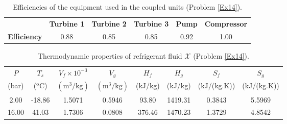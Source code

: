 \begin{enumerate}
\begin{table}[h]
\begin{center}
\begin{tabular}{||c | c c c c | c||}
\hline\hline
               &  {\bf Turbine 1} & {\bf Turbine 2}  & {\bf Turbine 3}  & {\bf Pump}  & {\bf Compressor}\\
{\bf Efficiency}&    0.88          &   0.85           &     0.85         &  0.92      &  1.00           \\
\hline\hline
\end{tabular}
\end{center}
\caption{Efficiencies of the equipment used in the coupled units (Problem \ref{Ex14}).}\label{Ex14:Tab2}
\end{table}


\begin{table}[h]
\begin{center}
\begin{tabular}{|c c| c c c c c c | }
\hline
$P$             & $T_{s}$   & $V_{f}\times 10^{-3}$  &  $V_{g}$   & $H_{f}$  & $H_{g}$   &  $S_{f}$   &  $S_{g}$    \\
(bar)   &  ($^{\text{o}}$C)  & $\left(\text{m}^{3}/\text{kg}\right)$ & $\left(\text{m}^{3}/\text{kg}\right)$ & (kJ/kg) & (kJ/kg) & (kJ/(kg.K)) &  (kJ/(kg.K))  \\
\hline
2.00    &  -18.86  & 1.5071  &  0.5946   &   93.80  & 1419.31  &  0.3843  & 5.5969   \\
16.00   &   41.03  & 1.7306  &  0.0808   &  376.46  &  1470.23 &  1.3729  & 4.8542   \\
\hline
\end{tabular}
\end{center}
\caption{Thermodynamic properties of refrigerant fluid $\mathcal{X}$ (Problem \ref{Ex14}).}\label{Ex14:Tab3}
\end{table}



\end{enumerate}
